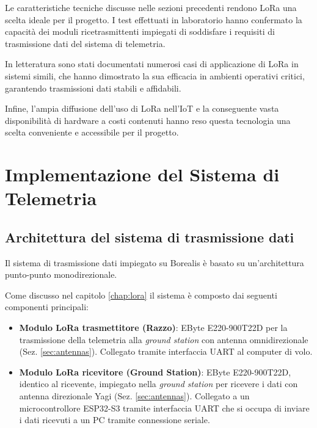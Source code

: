 \documentclass[12pt,a4paper,twoside]{book}
\begin{document}
Le caratteristiche tecniche discusse nelle sezioni precedenti rendono \ac{LoRa}
una scelta ideale per il progetto.
I test effettuati in laboratorio hanno confermato la capacità dei moduli
ricetrasmittenti impiegati di soddisfare i requisiti di trasmissione dati del
sistema di telemetria.

In letteratura sono stati documentati numerosi casi di applicazione di \ac{LoRa}
in sistemi simili\cite{Misbahuddin2022, Ma2024}, che hanno dimostrato la sua
efficacia in ambienti operativi critici, garantendo trasmissioni dati stabili e
affidabili.

Infine, l'ampia diffusione dell'uso di \ac{LoRa} nell'\ac{IoT} e la conseguente
vasta disponibilità di hardware a costi contenuti hanno reso questa tecnologia
una scelta conveniente e accessibile per il progetto.

\chapter{Implementazione del Sistema di Telemetria} \label{chap:telemetry}


\section{Architettura del sistema di trasmissione dati}
Il sistema di trasmissione dati impiegato su Borealis è basato su un'architettura
punto-punto monodirezionale.

Come discusso nel capitolo \ref{chap:lora} il sistema è composto dai seguenti componenti principali:
\begin{itemize}
    \item \textbf{Modulo \ac{LoRa} trasmettitore (Razzo)}: EByte E220-900T22D per
          la trasmissione della telemetria alla \emph{ground station} con antenna
          omnidirezionale (Sez. \ref{sec:antennas}).
          Collegato tramite interfaccia \ac{UART} al computer di volo.
    \item \textbf{Modulo \ac{LoRa} ricevitore (Ground Station)}: EByte E220-900T22D,
          identico al ricevente, impiegato nella \emph{ground station} per
          ricevere i dati con antenna direzionale Yagi (Sez. \ref{sec:antennas}).
          Collegato a un microcontrollore ESP32-S3 tramite interfaccia \ac{UART}
          che si occupa di inviare i dati ricevuti a un PC tramite connessione seriale.
\end{itemize}
\end{document}
